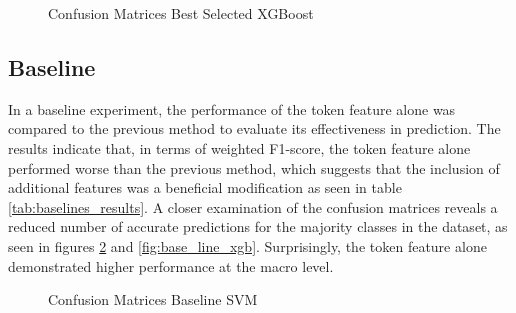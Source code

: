 \begin{figure}[!h]
\centering
  \caption{Confusion Matrices Best Selected XGBoost}
  \label{fig:best_xgb}
\end{figure}













\FloatBarrier
\subsection{Baseline}

In a baseline experiment, the performance of the token feature alone was compared to the previous method to evaluate its effectiveness in prediction. The results indicate that, in terms of weighted F1-score, the token feature alone performed worse than the previous method, which suggests that the inclusion of additional features was a beneficial modification as seen in table \ref{tab:baselines_results}. A closer examination of the confusion matrices reveals a reduced number of accurate predictions for the majority classes in the dataset, as seen in figures \ref{fig:base_line_svm} and \ref{fig:base_line_xgb}. Surprisingly, the token feature alone demonstrated higher performance at the macro level.


\begin{figure}[!ht]
\centering
  \caption{Confusion Matrices Baseline SVM}
  \label{fig:base_line_svm}
\end{figure}


